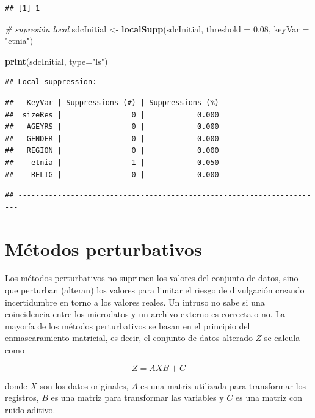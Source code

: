 \documentclass[]{book}
\newenvironment{Shaded}{\begin{snugshade}}{\end{snugshade}}
\newcommand{\CommentTok}[1]{\textcolor[rgb]{0.56,0.35,0.01}{\textit{#1}}}
\newcommand{\DataTypeTok}[1]{\textcolor[rgb]{0.13,0.29,0.53}{#1}}
\newcommand{\FloatTok}[1]{\textcolor[rgb]{0.00,0.00,0.81}{#1}}
\newcommand{\KeywordTok}[1]{\textcolor[rgb]{0.13,0.29,0.53}{\textbf{#1}}}
\newcommand{\NormalTok}[1]{#1}
\newcommand{\StringTok}[1]{\textcolor[rgb]{0.31,0.60,0.02}{#1}}
\theoremstyle{definition}
\theoremstyle{definition}
\theoremstyle{definition}
\theoremstyle{definition}
\theoremstyle{remark}
\begin{document}
\begin{verbatim}
## [1] 1
\end{verbatim}

\begin{Shaded}
\begin{Highlighting}[]
\CommentTok{# supresión local}
\NormalTok{sdcInitial <-}\StringTok{ }\KeywordTok{localSupp}\NormalTok{(sdcInitial, }\DataTypeTok{threshold =} \FloatTok{0.08}\NormalTok{, }\DataTypeTok{keyVar =} \StringTok{"etnia"}\NormalTok{)}

\KeywordTok{print}\NormalTok{(sdcInitial, }\DataTypeTok{type=}\StringTok{"ls"}\NormalTok{)}
\end{Highlighting}
\end{Shaded}

\begin{verbatim}
## Local suppression:
\end{verbatim}

\begin{verbatim}
##   KeyVar | Suppressions (#) | Suppressions (%)
##  sizeRes |                0 |            0.000
##   AGEYRS |                0 |            0.000
##   GENDER |                0 |            0.000
##   REGION |                0 |            0.000
##    etnia |                1 |            0.050
##    RELIG |                0 |            0.000
\end{verbatim}

\begin{verbatim}
## ----------------------------------------------------------------------
\end{verbatim}

\hypertarget{muxe9todos-perturbativos}{%
\section{Métodos perturbativos}\label{muxe9todos-perturbativos}}

Los métodos perturbativos no suprimen los valores del conjunto de datos, sino que perturban (alteran) los valores para limitar el riesgo de divulgación creando incertidumbre en torno a los valores reales. Un intruso no sabe si una coincidencia entre los microdatos y un archivo externo es correcta o no. La mayoría de los métodos perturbativos se basan en el principio del enmascaramiento matricial, es decir, el conjunto de datos alterado \(Z\) se calcula como

\[Z = AXB + C\]

donde \(X\) son los datos originales, \(A\) es una matriz utilizada para transformar los registros, \(B\) es una matriz para transformar las variables y \(C\) es una matriz con ruido aditivo.
\end{document}
